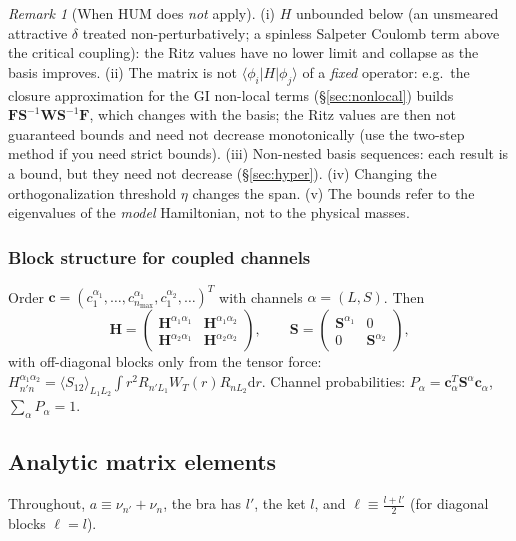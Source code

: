 \documentclass[11pt,a4paper]{article}
\numberwithin{equation}{section}
\theoremstyle{definition}
\theoremstyle{plain}
\theoremstyle{remark}
\newtheorem{remark}[definition]{Remark}
\numberwithin{algorithm}{section}
\newcommand{\dd}{\mathrm{d}}
\newcommand{\mH}{\mathbf H}
\newcommand{\mS}{\mathbf S}
\newcommand{\vc}{\bm c}
\begin{document}
\begin{remark}[When HUM does \emph{not} apply]
(i) $H$ unbounded below (an unsmeared attractive $\delta$ treated non-perturbatively; a spinless Salpeter Coulomb term above the critical coupling): the Ritz values have no lower limit and collapse as the basis improves. (ii) The matrix is not $\langle\phi_i|H|\phi_j\rangle$ of a \emph{fixed} operator: e.g.\ the closure approximation for the GI non-local terms (\S\ref{sec:nonlocal}) builds $\mathbf F\mS^{-1}\mathbf W\mS^{-1}\mathbf F$, which changes with the basis; the Ritz values are then not guaranteed bounds and need not decrease monotonically (use the two-step method if you need strict bounds). (iii) Non-nested basis sequences: each result is a bound, but they need not decrease (\S\ref{sec:hyper}). (iv) Changing the orthogonalization threshold $\eta$ changes the span. (v) The bounds refer to the eigenvalues of the \emph{model} Hamiltonian, not to the physical masses.
\end{remark}

\subsubsection{Block structure for coupled channels}\label{sec:blocks}
Order $\vc=(c^{\alpha_1}_1,\dots,c^{\alpha_1}_{n_{\max}},c^{\alpha_2}_1,\dots)^T$ with channels $\alpha=(L,S)$. Then
\begin{equation}
\mH=\begin{pmatrix}\mH^{\alpha_1\alpha_1}&\mH^{\alpha_1\alpha_2}\\ \mH^{\alpha_2\alpha_1}&\mH^{\alpha_2\alpha_2}\end{pmatrix},\qquad
\mS=\begin{pmatrix}\mS^{\alpha_1}&0\\0&\mS^{\alpha_2}\end{pmatrix},
\end{equation}
with off-diagonal blocks only from the tensor force: $H^{\alpha_1\alpha_2}_{n'n}=\langle S_{12}\rangle_{L_1L_2}\int r^2R_{n'L_1}W_T(r)R_{nL_2}\dd r$. Channel probabilities: $P_\alpha=\vc_\alpha^T\mS^\alpha\vc_\alpha$, $\sum_\alpha P_\alpha=1$.

\subsection{Analytic matrix elements}\label{sec:me}
Throughout, $a\equiv\nu_{n'}+\nu_n$, the bra has $l'$, the ket $l$, and $\ell\equiv\frac{l+l'}2$ (for diagonal blocks $\ell=l$).
\end{document}
